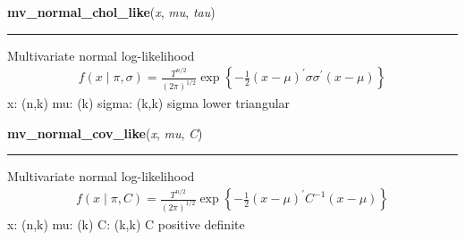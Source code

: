 \hspace{.8\funcindent}\begin{boxedminipage}{\funcwidth}

    \raggedright \textbf{mv\_normal\_chol\_like}(\textit{x}, \textit{mu}, \textit{tau})

    \vspace{-1.5ex}

    \rule{\textwidth}{1pt}
\setlength{\parskip}{2ex}

Multivariate normal log-likelihood
\begin{equation*}\begin{split}f(x \mid \pi, \sigma) = \frac{T^{n/2}}{(2\pi)^{1/2}} \exp\left\{ -\frac{1}{2} (x-\mu)^{\prime}\sigma \sigma^{\prime}(x-\mu) \right\}\end{split}\end{equation*}
x: (n,k)
mu: (k)
sigma: (k,k)
sigma lower triangular
\setlength{\parskip}{1ex}
    \end{boxedminipage}

    \label{pymc:distributions:mv_normal_cov_like}

    \vspace{0.5ex}

\hspace{.8\funcindent}\begin{boxedminipage}{\funcwidth}

    \raggedright \textbf{mv\_normal\_cov\_like}(\textit{x}, \textit{mu}, \textit{C})

    \vspace{-1.5ex}

    \rule{\textwidth}{1pt}
\setlength{\parskip}{2ex}

Multivariate normal log-likelihood
\begin{equation*}\begin{split}f(x \mid \pi, C) = \frac{T^{n/2}}{(2\pi)^{1/2}} \exp\left\{ -\frac{1}{2} (x-\mu)^{\prime}C^{-1}(x-\mu) \right\}\end{split}\end{equation*}
x: (n,k)
mu: (k)
C: (k,k)
C positive definite
\setlength{\parskip}{1ex}
    \end{boxedminipage}

    \label{pymc:distributions:mv_normal_like}

    \vspace{0.5ex}

